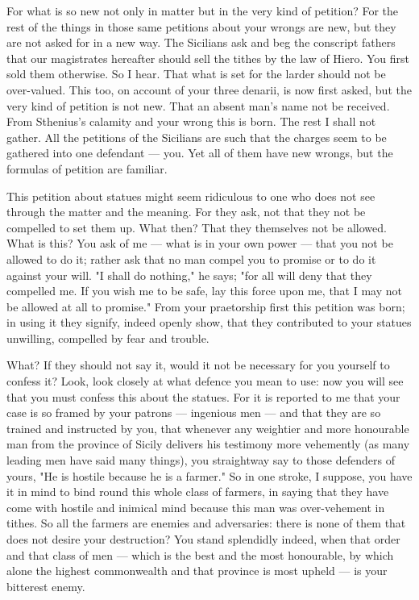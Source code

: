  For what is so new not only in matter but in the very kind of petition? For the rest of the things in those same petitions about your wrongs are new, but they are not asked for in a new way. The Sicilians ask and beg the conscript fathers that our magistrates hereafter should sell the tithes by the law of Hiero. You first sold them otherwise. So I hear. That what is set for the larder should not be over-valued. This too, on account of your three denarii, is now first asked, but the very kind of petition is not new. That an absent man's name not be received. From Sthenius's calamity and your wrong this is born. The rest I shall not gather. All the petitions of the Sicilians are such that the charges seem to be gathered into one defendant --- you. Yet all of them have new wrongs, but the formulas of petition are familiar.

 This petition about statues might seem ridiculous to one who does not see through the matter and the meaning. For they ask, not that they not be compelled to set them up. What then? That they themselves not be allowed. What is this? You ask of me --- what is in your own power --- that you not be allowed to do it; rather ask that no man compel you to promise or to do it against your will. "I shall do nothing," he says; "for all will deny that they compelled me. If you wish me to be safe, lay this force upon me, that I may not be allowed at all to promise." From your praetorship first this petition was born; in using it they signify, indeed openly show, that they contributed to your statues unwilling, compelled by fear and trouble.

 What? If they should not say it, would it not be necessary for you yourself to confess it? Look, look closely at what defence you mean to use: now you will see that you must confess this about the statues. For it is reported to me that your case is so framed by your patrons --- ingenious men --- and that they are so trained and instructed by you, that whenever any weightier and more honourable man from the province of Sicily delivers his testimony more vehemently (as many leading men have said many things), you straightway say to those defenders of yours, "He is hostile because he is a farmer." So in one stroke, I suppose, you have it in mind to bind round this whole class of farmers, in saying that they have come with hostile and inimical mind because this man was over-vehement in tithes. So all the farmers are enemies and adversaries: there is none of them that does not desire your destruction? You stand splendidly indeed, when that order and that class of men --- which is the best and the most honourable, by which alone the highest commonwealth and that province is most upheld --- is your bitterest enemy.

